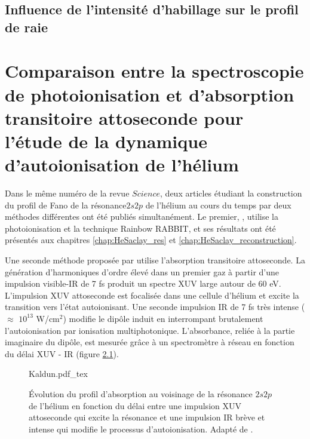 \section{Influence de l'intensité d'habillage sur le profil de raie}

















\chapter{Comparaison entre la spectroscopie de photoionisation et d'absorption transitoire attoseconde pour l'étude de la dynamique d'autoionisation de l'hélium}
Dans le même numéro de la revue $Science$, deux articles étudiant la construction du profil de Fano de la résonance$2s2p$ de l'hélium au cours du temps par deux méthodes différentes ont été publiés simultanément. Le premier, , utilise la photoionisation et la technique Rainbow RABBIT, et ses résultats ont été présentés aux chapitres \ref{chap:HeSaclay_res} et \ref{chap:HeSaclay_reconstruction}. 

Une seconde méthode proposée par  utilise l'absorption transitoire attoseconde. La génération d'harmoniques d'ordre élevé dans un premier gaz à partir d'une impulsion visible-IR de 7 fs produit un spectre XUV large autour de 60 eV. L'impulsion XUV attoseconde est focalisée dans une cellule d'hélium et excite la transition vers l'état autoionisant. Une seconde impulsion IR de 7 fs très intense ($\approx$ $10^{13}$ W/cm$^2$) modifie le dipôle induit en interrompant brutalement l'autoionisation par ionisation multiphotonique. L'absorbance, reliée à la partie imaginaire du dipôle, est mesurée grâce à un spectromètre à réseau en fonction du délai XUV - IR (figure \ref{fig:Kaldun}).

\begin{figure} [ht!]
\centering
\def\svgwidth{0.5\textwidth}
{Kaldun.pdf_tex}
\caption{\'{E}volution du profil d'absorption au voisinage de la résonance $2s2p$ de l'hélium en fonction du délai entre une impulsion XUV attoseconde qui excite la résonance et une impulsion IR brève et intense qui modifie le processus d'autoionisation. Adapté de .}
\label{fig:Kaldun}
\end{figure}

